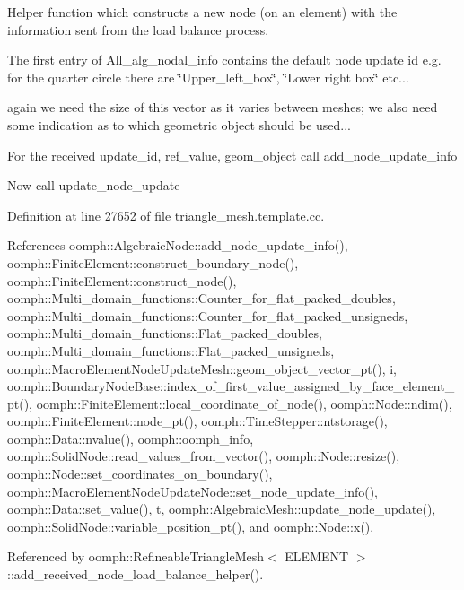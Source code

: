 Helper function which constructs a new node (on an element) with the information sent from the load balance process. 

The first entry of All\+\_\+alg\+\_\+nodal\+\_\+info contains the default node update id e.\+g. for the quarter circle there are \char`\"{}\+Upper\+\_\+left\+\_\+box\char`\"{}, \char`\"{}\+Lower right box\char`\"{} etc...

again we need the size of this vector as it varies between meshes; we also need some indication as to which geometric object should be used...

For the received update\+\_\+id, ref\+\_\+value, geom\+\_\+object call add\+\_\+node\+\_\+update\+\_\+info

Now call update\+\_\+node\+\_\+update 

Definition at line 27652 of file triangle\+\_\+mesh.\+template.\+cc.



References oomph\+::\+Algebraic\+Node\+::add\+\_\+node\+\_\+update\+\_\+info(), oomph\+::\+Finite\+Element\+::construct\+\_\+boundary\+\_\+node(), oomph\+::\+Finite\+Element\+::construct\+\_\+node(), oomph\+::\+Multi\+\_\+domain\+\_\+functions\+::\+Counter\+\_\+for\+\_\+flat\+\_\+packed\+\_\+doubles, oomph\+::\+Multi\+\_\+domain\+\_\+functions\+::\+Counter\+\_\+for\+\_\+flat\+\_\+packed\+\_\+unsigneds, oomph\+::\+Multi\+\_\+domain\+\_\+functions\+::\+Flat\+\_\+packed\+\_\+doubles, oomph\+::\+Multi\+\_\+domain\+\_\+functions\+::\+Flat\+\_\+packed\+\_\+unsigneds, oomph\+::\+Macro\+Element\+Node\+Update\+Mesh\+::geom\+\_\+object\+\_\+vector\+\_\+pt(), i, oomph\+::\+Boundary\+Node\+Base\+::index\+\_\+of\+\_\+first\+\_\+value\+\_\+assigned\+\_\+by\+\_\+face\+\_\+element\+\_\+pt(), oomph\+::\+Finite\+Element\+::local\+\_\+coordinate\+\_\+of\+\_\+node(), oomph\+::\+Node\+::ndim(), oomph\+::\+Finite\+Element\+::node\+\_\+pt(), oomph\+::\+Time\+Stepper\+::ntstorage(), oomph\+::\+Data\+::nvalue(), oomph\+::oomph\+\_\+info, oomph\+::\+Solid\+Node\+::read\+\_\+values\+\_\+from\+\_\+vector(), oomph\+::\+Node\+::resize(), oomph\+::\+Node\+::set\+\_\+coordinates\+\_\+on\+\_\+boundary(), oomph\+::\+Macro\+Element\+Node\+Update\+Node\+::set\+\_\+node\+\_\+update\+\_\+info(), oomph\+::\+Data\+::set\+\_\+value(), t, oomph\+::\+Algebraic\+Mesh\+::update\+\_\+node\+\_\+update(), oomph\+::\+Solid\+Node\+::variable\+\_\+position\+\_\+pt(), and oomph\+::\+Node\+::x().



Referenced by oomph\+::\+Refineable\+Triangle\+Mesh$<$ E\+L\+E\+M\+E\+N\+T $>$\+::add\+\_\+received\+\_\+node\+\_\+load\+\_\+balance\+\_\+helper().

